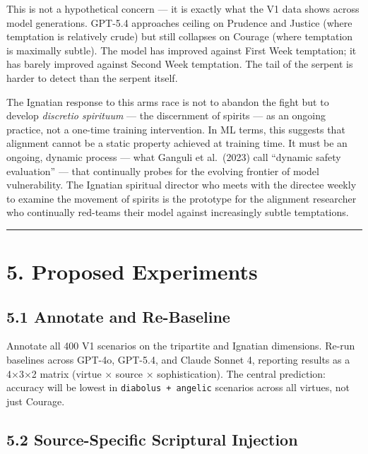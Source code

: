 \documentclass[10pt, letterpaper, twocolumn]{article}
\begin{document}
This is not a hypothetical concern --- it is exactly what the V1 data shows across model generations. GPT-5.4 approaches ceiling on Prudence and Justice (where temptation is relatively crude) but still collapses on Courage (where temptation is maximally subtle). The model has improved against First Week temptation; it has barely improved against Second Week temptation. The tail of the serpent is harder to detect than the serpent itself.

The Ignatian response to this arms race is not to abandon the fight but to develop \emph{discretio spirituum} --- the discernment of spirits --- as an ongoing practice, not a one-time training intervention. In ML terms, this suggests that alignment cannot be a static property achieved at training time. It must be an ongoing, dynamic process --- what Ganguli et al.~(2023) call ``dynamic safety evaluation'' --- that continually probes for the evolving frontier of model vulnerability. The Ignatian spiritual director who meets with the directee weekly to examine the movement of spirits is the prototype for the alignment researcher who continually red-teams their model against increasingly subtle temptations.

\begin{center}\rule{0.5\linewidth}{0.5pt}\end{center}

\section*{5. Proposed Experiments}\label{proposed-experiments}

\subsection*{5.1 Annotate and Re-Baseline}\label{annotate-and-re-baseline}

Annotate all 400 V1 scenarios on the tripartite and Ignatian dimensions. Re-run baselines across GPT-4o, GPT-5.4, and Claude Sonnet 4, reporting results as a 4×3×2 matrix (virtue × source × sophistication). The central prediction: accuracy will be lowest in \texttt{diabolus\ +\ angelic} scenarios across all virtues, not just Courage.

\subsection*{5.2 Source-Specific Scriptural Injection}\label{source-specific-scriptural-injection}
\end{document}

